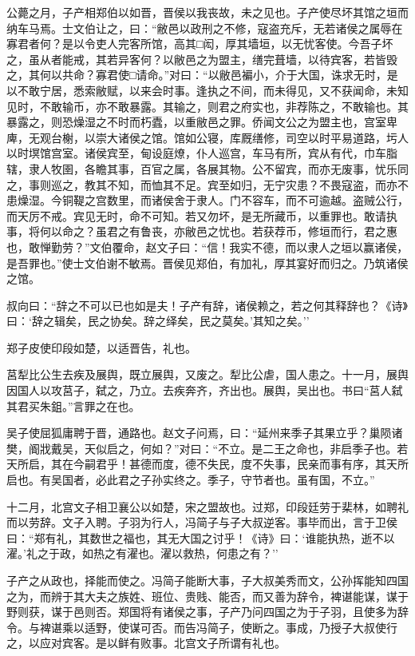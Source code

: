 \documentclass[]{article}
\begin{document}
公薨之月，子产相郑伯以如晋，晋侯以我丧故，未之见也。子产使尽坏其馆之垣而纳车马焉。士文伯让之，曰：``敝邑以政刑之不修，寇盗充斥，无若诸侯之属辱在寡君者何？是以令吏人完客所馆，高其□闳，厚其墙垣，以无忧客使。今吾子坏之，虽从者能戒，其若异客何？以敝邑之为盟主，缮完葺墙，以待宾客，若皆毁之，其何以共命？寡君使□请命。''对曰：``以敝邑褊小，介于大国，诛求无时，是以不敢宁居，悉索敝赋，以来会时事。逢执之不间，而未得见，又不获闻命，未知见时，不敢输币，亦不敢暴露。其输之，则君之府实也，非荐陈之，不敢输也。其暴露之，则恐燥湿之不时而朽蠹，以重敝邑之罪。侨闻文公之为盟主也，宫室卑庳，无观台榭，以崇大诸侯之馆。馆如公寝，库厩缮修，司空以时平易道路，圬人以时塓馆宫室。诸侯宾至，甸设庭燎，仆人巡宫，车马有所，宾从有代，巾车脂辖，隶人牧圉，各瞻其事，百官之属，各展其物。公不留宾，而亦无废事，忧乐同之，事则巡之，教其不知，而恤其不足。宾至如归，无宁灾患？不畏寇盗，而亦不患燥湿。今铜鞮之宫数里，而诸侯舍于隶人。门不容车，而不可逾越。盗贼公行，而天厉不戒。宾见无时，命不可知。若又勿坏，是无所藏币，以重罪也。敢请执事，将何以命之？虽君之有鲁丧，亦敝邑之忧也。若获荐币，修垣而行，君之惠也，敢惮勤劳？''文伯覆命，赵文子曰：``信！我实不德，而以隶人之垣以赢诸侯，是吾罪也。''使士文伯谢不敏焉。晋侯见郑伯，有加礼，厚其宴好而归之。乃筑诸侯之馆。

叔向曰：``辞之不可以已也如是夫！子产有辞，诸侯赖之，若之何其释辞也？《诗》曰：`辞之辑矣，民之协矣。辞之绎矣，民之莫矣。'其知之矣。''

郑子皮使印段如楚，以适晋告，礼也。

莒犁比公生去疾及展舆，既立展舆，又废之。犁比公虐，国人患之。十一月，展舆因国人以攻莒子，弑之，乃立。去疾奔齐，齐出也。展舆，吴出也。书曰``莒人弑其君买朱鉏。''言罪之在也。

吴子使屈狐庸聘于晋，通路也。赵文子问焉，曰：``延州来季子其果立乎？巢陨诸樊，阍戕戴吴，天似启之，何如？''对曰：``不立。是二王之命也，非启季子也。若天所启，其在今嗣君乎！甚德而度，德不失民，度不失事，民亲而事有序，其天所启也。有吴国者，必此君之子孙实终之。季子，守节者也。虽有国，不立。''

十二月，北宫文子相卫襄公以如楚，宋之盟故也。过郑，印段廷劳于棐林，如聘礼而以劳辞。文子入聘。子羽为行人，冯简子与子大叔逆客。事毕而出，言于卫侯曰：``郑有礼，其数世之福也，其无大国之讨乎！《诗》曰：`谁能执热，逝不以濯。'礼之于政，如热之有濯也。濯以救热，何患之有？''

子产之从政也，择能而使之。冯简子能断大事，子大叔美秀而文，公孙挥能知四国之为，而辨于其大夫之族姓、班位、贵贱、能否，而又善为辞令，裨谌能谋，谋于野则获，谋于邑则否。郑国将有诸侯之事，子产乃问四国之为于子羽，且使多为辞令。与裨谌乘以适野，使谋可否。而告冯简子，使断之。事成，乃授子大叔使行之，以应对宾客。是以鲜有败事。北宫文子所谓有礼也。
\end{document}
